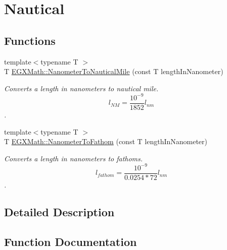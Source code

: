 \hypertarget{group___e_g_x_math-_conversions-_length_conversions-_s_i-_nanometer-_nautical}{}\section{Nautical}
\label{group___e_g_x_math-_conversions-_length_conversions-_s_i-_nanometer-_nautical}
\subsection*{Functions}
\begin{DoxyCompactItemize}
\item 
{\footnotesize template$<$typename T $>$ }\\T \mbox{\hyperlink{group___e_g_x_math-_conversions-_length_conversions-_s_i-_nanometer-_nautical_gac428c495bff87ba53c856395a7410fc3}{E\+G\+X\+Math\+::\+Nanometer\+To\+Nautical\+Mile}} (const T length\+In\+Nanometer)
\begin{DoxyCompactList}\small\item\em Converts a length in nanometers to nautical mile. \[ l_{NM}= \frac{10^{-9}}{1852} l_{nm} \]. \end{DoxyCompactList}\item 
{\footnotesize template$<$typename T $>$ }\\T \mbox{\hyperlink{group___e_g_x_math-_conversions-_length_conversions-_s_i-_nanometer-_nautical_ga934c7c5c17c283b51e1551b9731f05b6}{E\+G\+X\+Math\+::\+Nanometer\+To\+Fathom}} (const T length\+In\+Nanometer)
\begin{DoxyCompactList}\small\item\em Converts a length in nanometers to fathoms. \[ l_{fathom}= \frac{10^{-9}}{0.0254 * 72} l_{nm} \]. \end{DoxyCompactList}\end{DoxyCompactItemize}


\subsection{Detailed Description}


\subsection{Function Documentation}
\mbox{\label{group___e_g_x_math-_conversions-_length_conversions-_s_i-_nanometer-_nautical_ga934c7c5c17c283b51e1551b9731f05b6}} 
